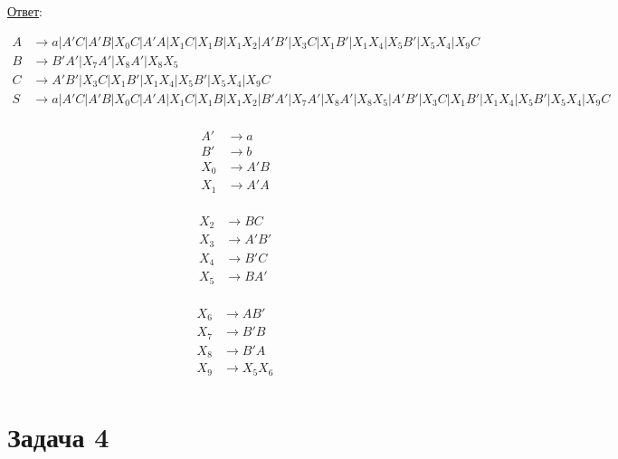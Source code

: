 \documentclass[a4paper]{article}
\begin{document}
\underline{Ответ}:
\vspace{-6ex}
\begin{multicols}{2}
	\begin{align*}
		A &\to a|A'C|A'B|X_0C|A'A|X_1C|X_1B|X_1X_2|A'B'|X_3C|X_1B'|X_1X_4|X_5B'|X_5X_4|X_9C\\
		B &\to B'A'|X_7A'|X_8A'|X_8X_5\\
		C &\to A'B'|X_3C|X_1B'|X_1X_4|X_5B'|X_5X_4|X_9C\\
		S &\to a|A'C|A'B|X_0C|A'A|X_1C|X_1B|X_1X_2|B'A'|X_7A'|X_8A'|X_8X_5|A'B'|X_3C|X_1B'|X_1X_4|X_5B'|X_5X_4|X_9C\\			
	\end{align*}
\end{multicols}
\vspace{-6ex}
\vspace{-6ex}
\begin{multicols}{3}
	\begin{align*}
		A' &\to a\\
		B' &\to b\\
		X_0 &\to A'B\\
		X_1 &\to A'A\\
	\end{align*}	
	
	\begin{align*}
		X_2 &\to BC\\
		X_3 &\to A'B'\\
		X_4 &\to B'C\\
		X_5 &\to BA'\\		
	\end{align*}	
	
	\begin{align*}
		X_6 &\to AB'\\
		X_7 &\to B'B\\
		X_8 &\to B'A\\
		X_9 &\to X_5X_6\\
	\end{align*}	
\end{multicols}
\vspace{-7ex}
\section*{Задача 4}
\end{document}
